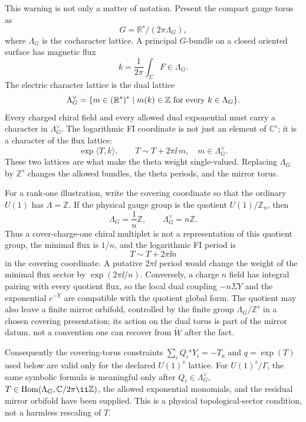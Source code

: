 \begin{construction}
\label{constr:glsm-global-form-flux-lattice-datum}
This warning is not only a matter of notation.  Present the compact gauge
torus as
\[
  G=\mathbb R^s/(2\pi\Lambda_G),
\]
where \(\Lambda_G\) is the cocharacter lattice.  A principal \(G\)-bundle on a
closed oriented surface has magnetic flux
\[
  k=\frac1{2\pi}\int_\Sigma F\in\Lambda_G .
\]
The electric character lattice is the dual lattice
\begin{equation}
  \Lambda_G^\vee
  =
  \{m\in(\mathbb R^s)^*\mid m(k)\in\mathbb Z
    \hbox{ for every }k\in\Lambda_G\}.
  \label{eq:glsm-global-form-character-lattice}
\end{equation}
Every charged chiral field and every allowed dual exponential must carry a
character in \(\Lambda_G^\vee\).  The logarithmic FI coordinate is not just an
element of \(\mathbb C^s\); it is a character of the flux lattice:
\begin{equation}
  \exp\langle T,k\rangle ,
  \qquad
  T\sim T+2\pi\ii\,m,\quad m\in\Lambda_G^\vee .
  \label{eq:glsm-global-form-fi-character}
\end{equation}
These two lattices are what make the theta weight single-valued.  Replacing
\(\Lambda_G\) by \(\mathbb Z^s\) changes the allowed bundles, the theta
periods, and the mirror torus.

For a rank-one illustration, write the covering coordinate so that the
ordinary \(U(1)\) has \(\Lambda=\mathbb Z\).  If the physical gauge group is
the quotient \(U(1)/\mathbb Z_n\), then
\begin{equation}
  \Lambda_G=\frac1n\mathbb Z,
  \qquad
  \Lambda_G^\vee=n\mathbb Z .
  \label{eq:glsm-u1-zn-flux-character-lattices}
\end{equation}
Thus a cover-charge-one chiral multiplet is not a representation of this
quotient group, the minimal flux is \(1/n\), and the logarithmic FI period is
\[
  T\sim T+2\pi\ii n
\]
in the covering coordinate.  A putative \(2\pi\ii\) period would change the
weight of the minimal flux sector by \(\exp(2\pi\ii/n)\).  Conversely, a
charge \(n\) field has integral pairing with every quotient flux, so the local
dual coupling \(-n\Sigma Y\) and the exponential \(e^{-Y}\) are compatible
with the quotient global form.  The quotient may also leave a finite mirror
orbifold, controlled by the finite group
\(\Lambda_G/\mathbb Z^s\) in a chosen covering presentation; its action on the
dual torus is part of the mirror datum, not a convention one can recover from
\(\widetilde W\) after the fact.

Consequently the covering-torus constraints
\(\sum_iQ_i{}^aY_i=-T_a\) and \(q=\exp(T)\) used below are valid only for the
declared \(U(1)^s\) lattice.  For \(U(1)^s/\Gamma\), the same symbolic formula
is meaningful only after \(Q_i\in\Lambda_G^\vee\), \(T\in
{\rm Hom}(\Lambda_G,\mathbb C/2\pi\ii\mathbb Z)\), the allowed exponential
monomials, and the residual mirror orbifold have been supplied.  This is a
physical topological-sector condition, not a harmless rescaling of \(T\).
\end{construction}

